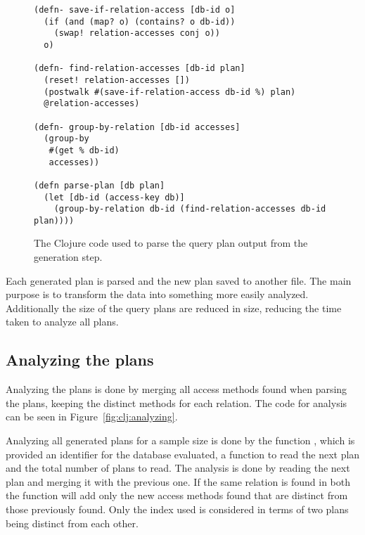 \begin{figure}[ht]
\begin{verbatim}
(defn- save-if-relation-access [db-id o]
  (if (and (map? o) (contains? o db-id))
    (swap! relation-accesses conj o))
  o)

(defn- find-relation-accesses [db-id plan]
  (reset! relation-accesses [])
  (postwalk #(save-if-relation-access db-id %) plan)
  @relation-accesses)

(defn- group-by-relation [db-id accesses]
  (group-by
   #(get % db-id)
   accesses))

(defn parse-plan [db plan]
  (let [db-id (access-key db)]
    (group-by-relation db-id (find-relation-accesses db-id plan))))
   \end{verbatim}
   \caption[The Clojure code to parse a query]{The Clojure code used to parse
     the query plan output from the generation step.}
\label{fig:clj:parsing}
\end{figure}

Each generated plan is parsed and the new plan saved to another file. The main
purpose is to transform the data into something more easily analyzed.
Additionally the size of the query plans are reduced in size, reducing the
time taken to analyze all plans.

\subsection{Analyzing the plans}\label{sec:analyzingplans}
Analyzing the plans is done by merging all access methods found when parsing the
plans, keeping the distinct methods for each relation. The code for analysis can
be seen in Figure~\ref{fig:clj:analyzing}.

Analyzing all generated plans for a sample size is done by the function
, which is provided an identifier for the database evaluated,
a function to read the next plan and the total number of plans to read. The
analysis is done by reading the next plan and merging it with the previous one.
If the same relation is found in both the function  will add
only the new access methods found that are distinct from those previously found.
Only the index used is considered in terms of two plans being distinct from each
other.

